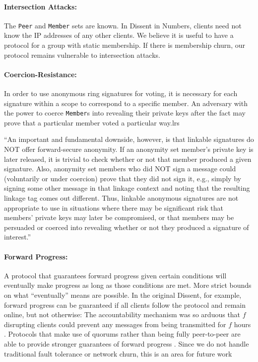   \paragraph{Intersection Attacks:} The \texttt{Peer} and \texttt{Member} sets
  are known. In Dissent in Numbers, clients need not know the IP addresses of
  any other clients. We believe it is useful to have a protocol for a group with
  static membership.  If there is membership churn, our protocol remains
  vulnerable to intersection attacks.
  \paragraph{Coercion-Resistance:} In order to use anonymous ring signatures for
  voting, it is necessary for each signature within a scope to correspond to a
  specific member. An adversary with the power to coerce \texttt{Member}s into
  revealing their private keys after the fact may prove that a particular member
  voted a particular way\cite{lrs}.lrs

``An important and fundamental downside,
however, is that linkable signatures do NOT offer forward-secure anonymity. If
an anonymity set member's private key is later released, it is trivial to check
whether or not that member produced a given signature. Also, anonymity set
members who did NOT sign a message could (voluntarily or under coercion) prove
that they did not sign it, e.g., simply by signing some other message in that
linkage context and noting that the resulting linkage tag comes out different.
Thus, linkable anonymous signatures are not appropriate to use in situations
where there may be significant risk that members' private keys may later be
compromised, or that members may be persuaded or coerced into revealing whether
or not they produced a signature of interest.''
\cite{golrs}
  \paragraph{Forward Progress:} A protocol that guarantees forward progress
  given certain conditions will eventually make progress as long as those
  conditions are met. More strict bounds on what ``eventually'' means are
  possible. In the original Dissent, for example, forward progress can be
  guaranteed if all clients follow the protocol and remain online, but not
  otherwise: The accountability mechanism was so arduous that $f$ disrupting
  clients could prevent any messages from being transmitted for $f$ hours
  \cite{verdict}. Protocols that make use of quorums
  rather than being fully peer-to-peer are able to provide stronger guarantees
  of forward progress \cite{paxos}. Since we do not handle traditional fault
  tolerance or network churn,  this is an area
  for future work 
